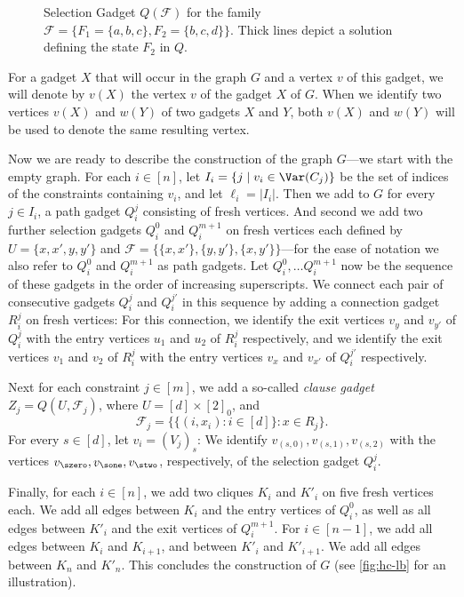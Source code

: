 \documentclass[a4paper,UKenglish,cleveref, autoref, thm-restate]{lipics-v2021}
\begin{document}
\begin{figure}[h]
    \centering
{}
\caption{\label{fig:selection-gadget}Selection Gadget $Q(\mathcal{F})$ for the family $\mathcal{F}=\big\{F_1 = \{a,b,c\}, F_2 = \{b,c,d\}\big\}$. Thick lines depict a solution defining the state $F_2$ in $Q$.}
\end{figure}

For a gadget $X$ that will occur in the graph $G$ and a vertex $v$ of this gadget, we will denote by $v(X)$ the vertex $v$ of the gadget $X$ of $G$.
When we identify two vertices $v(X)$ and $w(Y)$ of two gadgets $X$ and $Y$, both $v(X)$ and $w(Y)$ will be used to denote the same resulting vertex. 

Now we are ready to describe the construction of the graph $G$---we start with the empty graph. 
For each $i \in [n]$, let $I_i = \{j \mid v_i \in \Var(C_j)\}$ be the set of indices of the constraints containing $v_i$, and let $\ell_i = |I_i|$. 
Then we add to $G$ for every $j \in I_i$, 
a path gadget $Q_i^j$ consisting of fresh vertices.
And second we add two further selection gadgets 
$Q_i^0$ and $Q_i^{m+1}$ on fresh vertices each 
defined by $U = \{x,x',y,y'\}$ and $\mathcal{F} = \big\{\{x,x'\},\{y,y'\},\{x,y'\}\big\}$---for the ease of notation we also refer to $Q_i^0$ and $Q_i^{m+1}$ as path gadgets.
Let $Q_i^0, \dots Q_i^{m+1}$ now be the sequence of these gadgets in the order of increasing superscripts. We connect each pair of consecutive gadgets $Q_i^j$ and $Q_i^{j'}$ in this sequence by adding a connection gadget $R_i^j$ on fresh vertices: For this connection, we identify the exit vertices $v_y$ and $v_{y'}$ of $Q_i^j$ with the entry vertices $u_1$ and $u_2$ of $R_i^j$ respectively, and we identify the exit vertices $v_1$ and $v_2$ of $R_i^j$ with the entry vertices $v_x$ and $v_{x'}$ of $Q_i^{j'}$ respectively.

Next for each constraint $j \in [m]$, we add a so-called \emph{clause gadget} $Z_j = Q(U, \mathcal{F}_j)$, where $U = [d]\times [2]_0$, and
\[
    \mathcal{F}_j= \big\{\{(i,x_i)\colon i\in[d]  \} \colon x \in R_j\big\}.
\]
For every $s \in [d]$, let $v_i = (V_j)_s$: We identify $v_{(s, 0)}, v_{(s,1)}, v_{(s,2)}$ with the vertices $v_{\szero}, v_{\sone}, v_{\stwo}$, respectively, of the selection gadget $Q_i^j$. 

Finally, for each $i\in [n]$, we add two cliques $K_i$ and $K'_i$ on five fresh vertices each. We add all edges between $K_i$ and the entry vertices of $Q_i^0$, as well as all edges between $K'_i$ and the exit vertices of $Q_i^{m+1}$. For $i\in[n-1]$, we add all edges between $K_i$ and $K_{i+1}$, and between $K'_i$ and $K'_{i+1}$. We add all edges between $K_n$ and $K'_n$. This concludes the construction of $G$ (see \cref{fig:hc-lb} for an illustration). 
\end{document}
